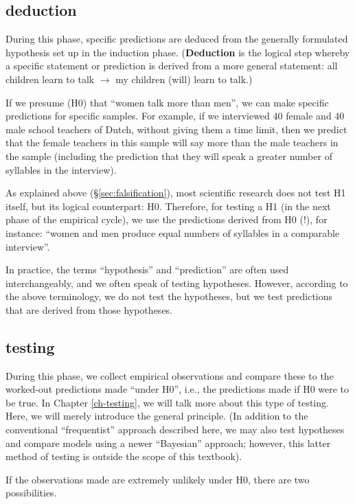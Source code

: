 \documentclass[
]{book}
\begin{document}
\subsection{deduction}\label{deduction}

During this phase, specific predictions are deduced from the generally formulated hypothesis set up in the induction phase. (\textbf{Deduction} is the logical step whereby a specific statement or prediction is derived from a more general statement: all children learn to talk \(\rightarrow\) my children (will) learn to talk.)

If we presume (H0) that ``women talk more than men'', we can make specific predictions for specific samples. For example, if we interviewed 40 female and 40 male school teachers of Dutch, without giving them a time limit, then we predict that the female teachers in this sample will say more than the male teachers in the sample (including the prediction that they will speak a greater number of syllables in the interview).

As explained above (§\ref{sec:falsification}), most scientific research does not test H1 itself, but its logical counterpart: H0. Therefore, for testing a H1 (in the next phase of the empirical cycle), we use the predictions derived from H0 (!), for instance: ``women and men produce equal numbers of syllables in a comparable interview''.

In practice, the terms ``hypothesis'' and ``prediction'' are often used interchangeably, and we often speak of testing hypotheses. However, according to the above terminology, we do not test the hypotheses, but we test predictions that are derived from those hypotheses.

\subsection{testing}\label{testing}

During this phase, we collect empirical observations and compare these to the worked-out predictions made ``under H0'', i.e., the predictions made if H0 were to be true. In Chapter \ref{ch-testing}, we will talk more about this type of testing. Here, we will merely introduce the general principle.
(In addition to the conventional ``frequentist'' approach described here, we may also test hypotheses and compare models using a newer ``Bayesian'' approach; however, this latter method of testing is outside the scope of this textbook).

If the observations made are extremely unlikely under H0, there are two possibilities.
\end{document}
